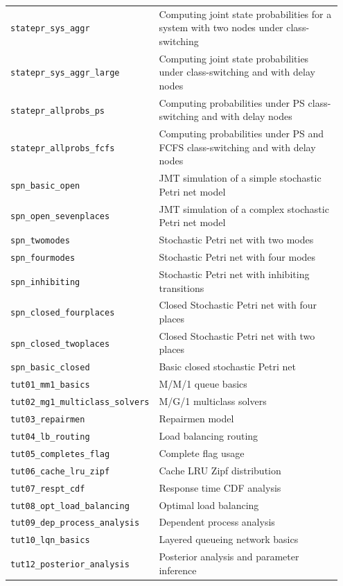 \begin{footnotesize}
\begin{longtable}{|p{0.35\linewidth}|p{0.60\linewidth}|}
\texttt{statepr\_sys\_aggr} &  Computing joint state probabilities for a system with two nodes under class-switching\\
\texttt{statepr\_sys\_aggr\_large} &  Computing joint state probabilities under class-switching and with delay nodes\\
\texttt{statepr\_allprobs\_ps} &  Computing probabilities under PS class-switching and with delay nodes\\
\texttt{statepr\_allprobs\_fcfs} &  Computing  probabilities under PS and FCFS class-switching and with delay nodes\\
\hline
\texttt{spn\_basic\_open} &  JMT simulation of a simple stochastic Petri net model\\
\texttt{spn\_open\_sevenplaces} &  JMT simulation of a complex stochastic Petri net model\\
\texttt{spn\_twomodes} & Stochastic Petri net with two modes\\
\texttt{spn\_fourmodes} & Stochastic Petri net with four modes\\
\texttt{spn\_inhibiting} & Stochastic Petri net with inhibiting transitions\\
\texttt{spn\_closed\_fourplaces} & Closed Stochastic Petri net with four places\\
\texttt{spn\_closed\_twoplaces} & Closed Stochastic Petri net with two places\\
\texttt{spn\_basic\_closed} & Basic closed stochastic Petri net\\
\hline
\texttt{tut01\_mm1\_basics} & M/M/1 queue basics\\
\texttt{tut02\_mg1\_multiclass\_solvers} & M/G/1 multiclass solvers\\
\texttt{tut03\_repairmen} & Repairmen model\\
\texttt{tut04\_lb\_routing} & Load balancing routing\\
\texttt{tut05\_completes\_flag} & Complete flag usage\\
\texttt{tut06\_cache\_lru\_zipf} & Cache LRU Zipf distribution\\
\texttt{tut07\_respt\_cdf} & Response time CDF analysis\\
\texttt{tut08\_opt\_load\_balancing} & Optimal load balancing\\
\texttt{tut09\_dep\_process\_analysis} & Dependent process analysis\\
\texttt{tut10\_lqn\_basics} & Layered queueing network basics\\
\texttt{tut12\_posterior\_analysis} & Posterior analysis and parameter inference\\

\end{longtable}
\end{footnotesize}
